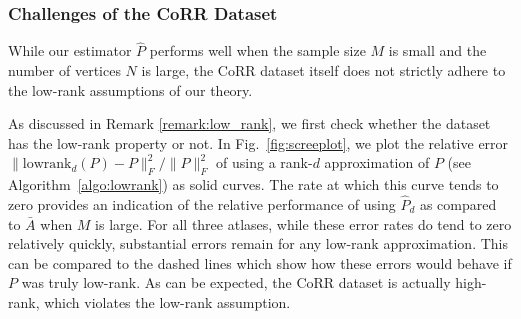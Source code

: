 \documentclass[10pt,letterpaper]{article}
\renewcommand{\hat}{\widehat}
\begin{document}
\subsubsection{Challenges of the CoRR Dataset}

While our estimator $\hat{P}$ performs well when the sample size $M$ is small and the number of vertices $N$ is large, the CoRR dataset itself does not strictly adhere to the low-rank assumptions of our theory.


As discussed in Remark \ref{remark:low_rank}, we first check whether the dataset has the low-rank property or not. In Fig.~\ref{fig:screeplot}, we plot the relative error $\|\mathrm{lowrank}_d(P)-P\|_F^2/\|P\|_F^2$ of using a rank-$d$ approximation of $P$ (see Algorithm~\ref{algo:lowrank}) as solid curves.
The rate at which this curve tends to zero provides an indication of the relative performance of using $\hat{P}_d$ as compared to $\bar{A}$ when $M$ is large. 
For all three atlases, while these error rates do tend to zero relatively quickly, substantial errors remain for any low-rank approximation.
This can be compared to the dashed lines which show how these errors would behave if $P$ was truly low-rank.
As can be expected, the CoRR dataset is actually high-rank, which violates the low-rank assumption.
\end{document}
